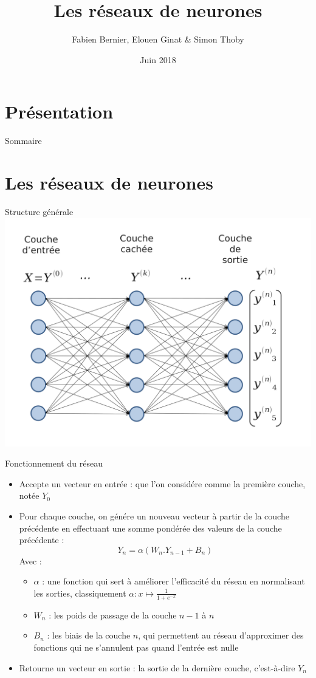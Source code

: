 \documentclass[ignorenonframetext,]{beamer}
\title{Les réseaux de neurones}
\author{Fabien Bernier, Elouen Ginat \& Simon Thoby}
\date{Juin 2018}
\begin{document}
\section*{Présentation}
\frame{\titlepage}

\begin{frame}{Sommaire}
\tableofcontents
\end{frame}

\section{Les réseaux de neurones}
\frame{\sectionpage}
\begin{frame}{Structure générale}
	\includegraphics{net-without-train.png}
\end{frame}

\begin{frame}{Fonctionnement du réseau}
	\begin{itemize}
		\item Accepte un vecteur en entrée : que l'on considére comme la première couche, notée $ Y_0 $ \\
		\item Pour chaque couche, on génére un nouveau vecteur à partir de la couche précédente en effectuant une somme pondérée des valeurs de la couche précédente : \[ Y_n = \alpha(W_n . Y_{n-1} + B_n) \]
			Avec :
		\begin{itemize}
			\item $ \alpha $ : une fonction qui sert à améliorer l'efficacité du réseau en normalisant les sorties, classiquement $ \alpha : x \mapsto \frac{1}{1+e^{-x}} $
			\item $ W_n $ : les poids de passage de la couche $ n-1 $ à $ n $
			\item $ B_n $ : les biais de la couche $ n $, qui permettent au réseau d'approximer des fonctions qui ne s'annulent pas quand l'entrée est nulle
		\end{itemize}
		\item Retourne un vecteur en sortie : la sortie de la dernière couche, c'est-à-dire $ Y_n $
	\end{itemize}
\end{frame}
\end{document}
